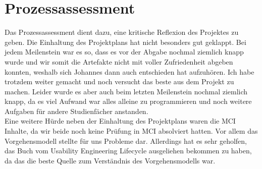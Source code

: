 \chapter{Prozessassessment}

Das Prozessassessment dient dazu, eine kritische Reflexion des Projektes zu geben. Die Einhaltung des Projektplans hat nicht besonders gut geklappt. Bei jedem Meilenstein war es so, dass es vor der Abgabe nochmal ziemlich knapp wurde und wir somit die Artefakte nicht mit voller Zufriedenheit abgeben konnten, weshalb sich Johannes dann auch entschieden hat aufzuhören. Ich habe trotzdem weiter gemacht und noch versucht das beste aus dem Projekt zu machen. Leider wurde es aber auch beim letzten Meilenstein nochmal ziemlich knapp, da es viel Aufwand war alles alleine zu programmieren und noch weitere Aufgaben für andere Studienfächer anstanden. 
\\
Eine weitere Hürde neben der Einhaltung des Projektplans waren die MCI Inhalte, da wir beide noch keine Prüfung in MCI absolviert hatten. Vor allem das Vorgehensmodell stellte für uns Probleme dar. Allerdings hat es sehr geholfen, das Buch vom Usability Engineering Lifecycle ausgeliehen bekommen zu haben, da das die beste Quelle zum Verständnis des Vorgehensmodells war.